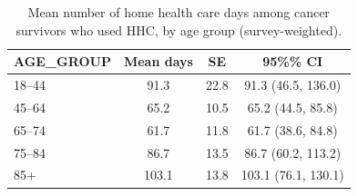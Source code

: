 
\begin{longtable}[t]{lccc}
\caption{\label{tab:tab:days-agegroup}Mean number of home health care days among cancer survivors who used HHC, by age group (survey-weighted).}\\
\toprule
AGE\_GROUP & Mean days & SE & 95\%\% CI\\
\midrule
18–44 & 91.3 & 22.8 & 91.3 (46.5, 136.0)\\
45–64 & 65.2 & 10.5 & 65.2 (44.5, 85.8)\\
65–74 & 61.7 & 11.8 & 61.7 (38.6, 84.8)\\
75–84 & 86.7 & 13.5 & 86.7 (60.2, 113.2)\\
85+ & 103.1 & 13.8 & 103.1 (76.1, 130.1)\\
\bottomrule
\end{longtable}
